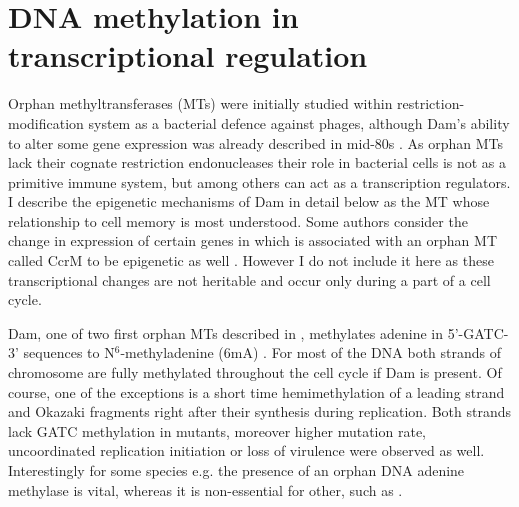 \section{DNA methylation in transcriptional regulation}
Orphan methyltransferases (MTs) were initially studied within restriction-modification system as a bacterial defence against phages, although Dam's ability to alter some gene expression was already described in mid-80s \cite{sternberg1985evidence, bickle1993biology}.
As orphan MTs lack their cognate restriction endonucleases their role in bacterial cells is not as a primitive immune system, but among others can act as a transcription regulators.
I describe the epigenetic mechanisms of Dam in detail below as the MT whose relationship to cell memory is most understood.
Some authors consider the change in expression of certain genes in  which is associated with an orphan MT called CcrM to be epigenetic as well \cite{casadesus2006epigenetic, adhikari2016dna}.
However I do not include it here as these transcriptional changes are not heritable and occur only during a part of a cell cycle.

Dam, one of two first orphan MTs described in , methylates adenine in 5'-GATC-3' sequences to N$^6$-methyladenine (6mA) \cite{marinus1973isolation}.
For most of the DNA both strands of chromosome are fully methylated throughout the cell cycle if Dam is present.
Of course, one of the exceptions is a short time hemimethylation of a leading strand and Okazaki fragments right after their synthesis during replication.
Both strands lack GATC methylation in  mutants, moreover higher mutation rate, uncoordinated replication initiation or loss of virulence were observed as well.
Interestingly for some species e.g.  the presence of an orphan DNA adenine methylase is vital, whereas it is non-essential for other, such as  \cite{casadesus2006epigenetic, casadesus2013programmed, adhikari2016dna}.

